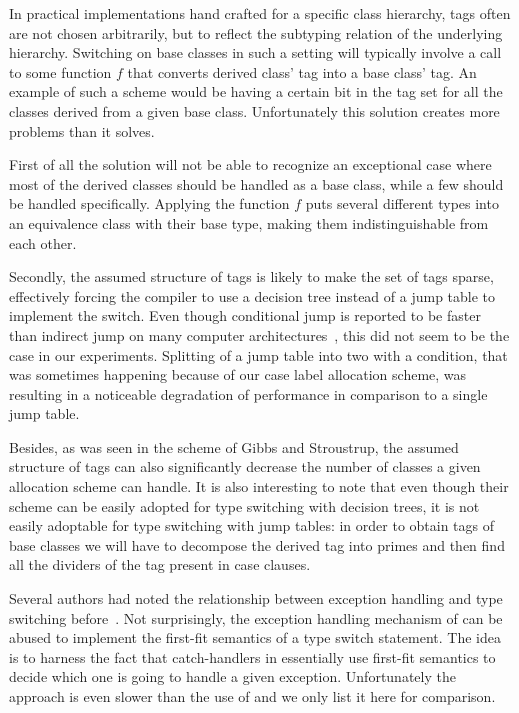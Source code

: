 In practical implementations hand crafted for a specific class hierarchy, tags 
often are not chosen arbitrarily, but to reflect the subtyping relation of the 
underlying hierarchy. Switching on base classes in such a setting will typically 
involve a call to some function $f$ that converts derived class' tag into a base 
class' tag. An example of such a scheme would be having a certain bit in the tag 
set for all the classes derived from a given base class. Unfortunately this 
solution creates more problems than it solves.

First of all the solution will not be able to recognize an exceptional case 
where most of the derived classes should be handled as a base class, while a few 
should be handled specifically. Applying the function $f$ puts several different 
types into an equivalence class with their base type, making them 
indistinguishable from each other.

Secondly, the assumed structure of tags is likely to make the set of tags 
sparse, effectively forcing the compiler to use a decision tree instead of a jump 
table to implement the switch. Even though conditional jump is reported to be 
faster than indirect jump on many computer architectures~\cite[]{garrigue-98}, this did not seem to be the case in our experiments. Splitting 
of a jump table into two with a condition, that was sometimes happening because 
of our case label allocation scheme, was resulting in a noticeable degradation of 
performance in comparison to a single jump table.

Besides, as was seen in the scheme of Gibbs and Stroustrup, the assumed 
structure of tags can also significantly decrease the number of classes a given 
allocation scheme can handle. It is also interesting to note that even though 
their scheme can be easily adopted for type switching with decision trees, it is 
not easily adoptable for type switching with jump tables: in order to obtain 
tags of base classes we will have to decompose the derived tag into primes and 
then find all the dividers of the tag present in case clauses.

Several authors had noted the relationship between exception handling and type 
switching before~\cite{Glew99,ML2000}. Not surprisingly, the exception handling 
mechanism of \Cpp{} can be abused to implement the first-fit semantics of a type 
switch statement. The idea is to harness the fact that catch-handlers in \Cpp{} 
essentially use first-fit semantics to decide which one is going to handle a 
given exception. Unfortunately the approach is even slower than the use of 
 and we only list it here for comparison.

